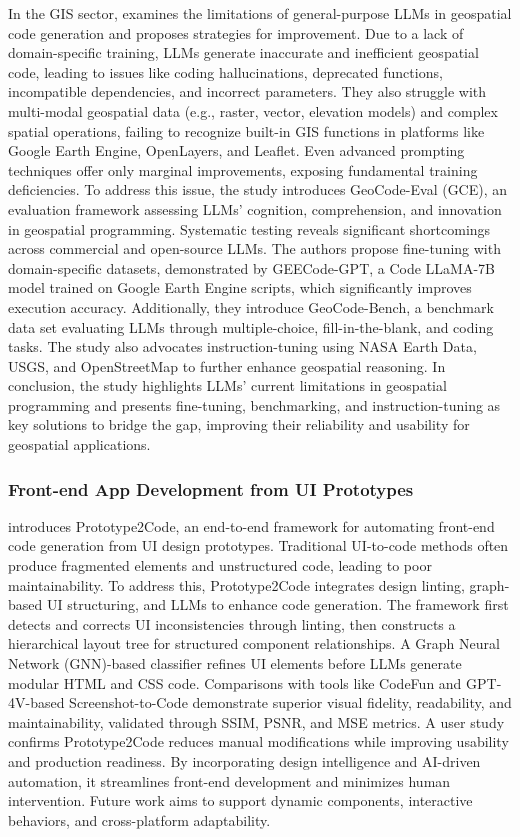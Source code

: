 In the GIS sector, \citet{hou2024can} examines the limitations of general-purpose LLMs in geospatial code generation and proposes strategies for improvement. Due to a lack of domain-specific training, LLMs generate inaccurate and inefficient geospatial code, leading to issues like coding hallucinations, deprecated functions, incompatible dependencies, and incorrect parameters. They also struggle with multi-modal geospatial data (e.g., raster, vector, elevation models) and complex spatial operations, failing to recognize built-in GIS functions in platforms like Google Earth Engine, OpenLayers, and Leaflet. Even advanced prompting techniques offer only marginal improvements, exposing fundamental training deficiencies. To address this issue, the study introduces GeoCode-Eval (GCE), an evaluation framework assessing LLMs' cognition, comprehension, and innovation in geospatial programming. Systematic testing reveals significant shortcomings across commercial and open-source LLMs. The authors propose fine-tuning with domain-specific datasets, demonstrated by GEECode-GPT, a Code LLaMA-7B model trained on Google Earth Engine scripts, which significantly improves execution accuracy. Additionally, they introduce GeoCode-Bench, a benchmark data set evaluating LLMs through multiple-choice, fill-in-the-blank, and coding tasks. The study also advocates instruction-tuning using NASA Earth Data, USGS, and OpenStreetMap to further enhance geospatial reasoning. In conclusion, the study highlights LLMs' current limitations in geospatial programming and presents fine-tuning, benchmarking, and instruction-tuning as key solutions to bridge the gap, improving their reliability and usability for geospatial applications.

\subsubsection{Front-end App Development from UI Prototypes}
\citet{xiao2024prototype2code} introduces Prototype2Code, an end-to-end framework for automating front-end code generation from UI design prototypes. Traditional UI-to-code methods often produce fragmented elements and unstructured code, leading to poor maintainability. To address this, Prototype2Code integrates design linting, graph-based UI structuring, and LLMs to enhance code generation. The framework first detects and corrects UI inconsistencies through linting, then constructs a hierarchical layout tree for structured component relationships. A Graph Neural Network (GNN)-based classifier refines UI elements before LLMs generate modular HTML and CSS code. Comparisons with tools like CodeFun and GPT-4V-based Screenshot-to-Code demonstrate superior visual fidelity, readability, and maintainability, validated through SSIM, PSNR, and MSE metrics. A user study confirms Prototype2Code reduces manual modifications while improving usability and production readiness. By incorporating design intelligence and AI-driven automation, it streamlines front-end development and minimizes human intervention. Future work aims to support dynamic components, interactive behaviors, and cross-platform adaptability.

